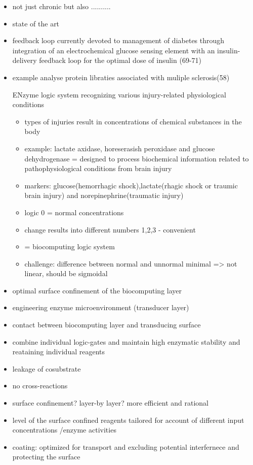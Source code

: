 \documentclass[runningheads]{llncs}
\begin{document}
\begin{itemize}
	\item not just chronic but also ..........
	\item state of the art
	\item feedback loop currently devoted to management of diabetes through integration of an electrochemical glucose sensing element with an insulin-delivery feedback loop for the optimal dose of insulin (69-71)
	\item example analyse protein libraties associated with muliple sclerosis(58)
	
	ENzyme logic system recognizing various injury-related physiological conditions
	\begin{itemize}
		\item types of injuries result in concentrations of chemical substances in the body
		
		\item example: lactate axidase, horeserasish peroxidase and glucose dehydrogenase = designed to process biochemical information related to pathophysiological conditions from brain injury
		\item markers: glucose(hemorrhagic shock),lactate(rhagic shock or traumic brain injury) and norepinephrine(traumatic injury)
		\item logic 0 = normal concentrations
		\item change results into different numbers 1,2,3 - convenient
		\item = biocomputing logic system 
		\item challenge: difference between normal and unnormal minimal => not linear, should be sigmoidal	
	\end{itemize}
\end{itemize}
	\begin{itemize}
	\item optimal surface confinement of the biocomputing layer
	\item engineering enzyme microenvironment (transducer layer)
	\item contact between biocomputing layer and transducing surface
	\item combine individual logic-gates and maintain high enzymatic stability and reataining individual reagents
	\item leakage of cosubstrate 
	\item no cross-reactions
	\item surface confinement? layer-by layer? more efficient and rational 
	\item level of the surface confined reagents tailored for account of different input concentrations /enzyme activities 
	\item coating: optimized for transport and excluding potential interfernece and protecting the surface
\end{itemize}
\end{document}
